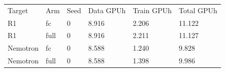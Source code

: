\begin{tabular}{llllll}
Target & Arm & Seed & Data GPUh & Train GPUh & Total GPUh \\
R1 & fc & 0 & 8.916 & 2.206 & 11.122 \\
R1 & full & 0 & 8.916 & 2.211 & 11.127 \\
Nemotron & fc & 0 & 8.588 & 1.240 & 9.828 \\
Nemotron & full & 0 & 8.588 & 1.398 & 9.986 \\
\end{tabular}
